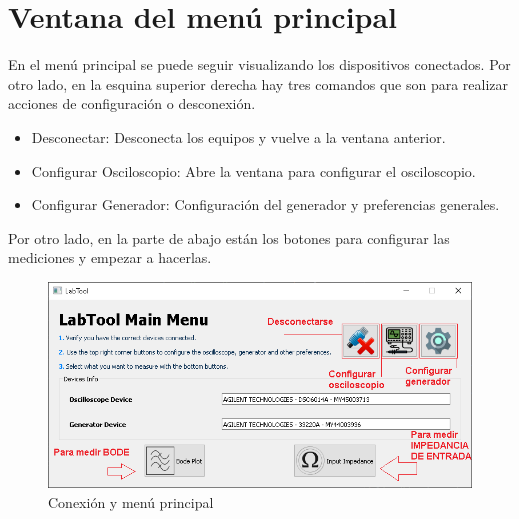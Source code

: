 \section{Ventana del men\'u principal}
En el men\'u principal se puede seguir visualizando los dispositivos conectados. Por otro lado, en la esquina superior derecha hay tres comandos
que son para realizar acciones de configuraci\'on o desconexi\'on.
\begin{itemize}
    \item Desconectar: Desconecta los equipos y vuelve a la ventana anterior.
    \item Configurar Osciloscopio: Abre la ventana para configurar el osciloscopio.
    \item Configurar Generador: Configuraci\'on del generador y preferencias generales.
\end{itemize}

Por otro lado, en la parte de abajo est\'an los botones para configurar las mediciones y empezar a hacerlas.

\begin{figure}[H]
    \centering
        \includegraphics[scale=0.8]{../screenshots/main_menu.PNG}
    \caption{Conexi\'on y men\'u principal}
\end{figure}

